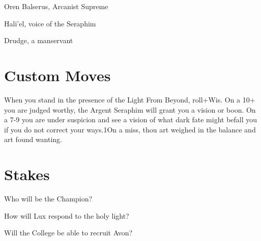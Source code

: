 \item Oren Balserus, Arcanist Supreme

 
\item Hali'el, voice of the Seraphim

 
\item Drudge, a manservant


\stopitemize
 
\section{Custom Moves}    
 

When you stand in the presence of the Light From Beyond, roll+Wis. On a 10+ you are judged worthy, the Argent Seraphim will grant you a vision or boon. On a 7-9 you are under suspicion and see a vision of what dark fate might befall you if you do not correct your ways.1On a miss, thou art weighed in the balance and art found wanting.

 
\section{Stakes}   
 
\startitemize[1,packed]

\item Who will be the Champion?

 
\item How will Lux respond to the holy light?

 
\item Will the College be able to recruit Avon?


\stopitemize
 

 




